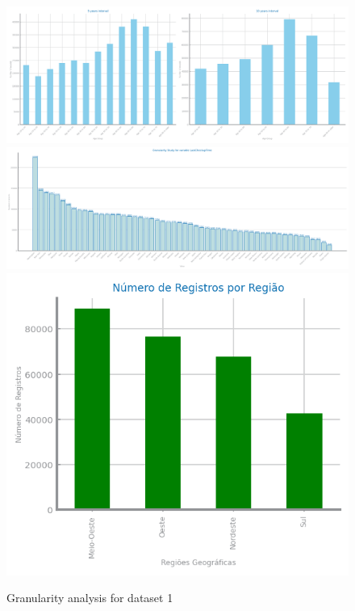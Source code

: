 \documentclass[10pt]{extarticle}
\begin{document}
\begin{figure}[H]
\centering\includegraphics[scale=0.5]{images/dataset1/data_preparation/CovidPos_AgeCategory_study_for_granularity.png}
\includegraphics[scale=0.4]{images/dataset1/data_preparation/CovidPos_State_study_for_granularity.png}
\centering\includegraphics[scale=1.0]{images/dataset1/data_preparation/CovidPos_State_per_region_study_for_granularity.png}


\caption{Granularity analysis for dataset 1}
\end{figure}
\end{document}
